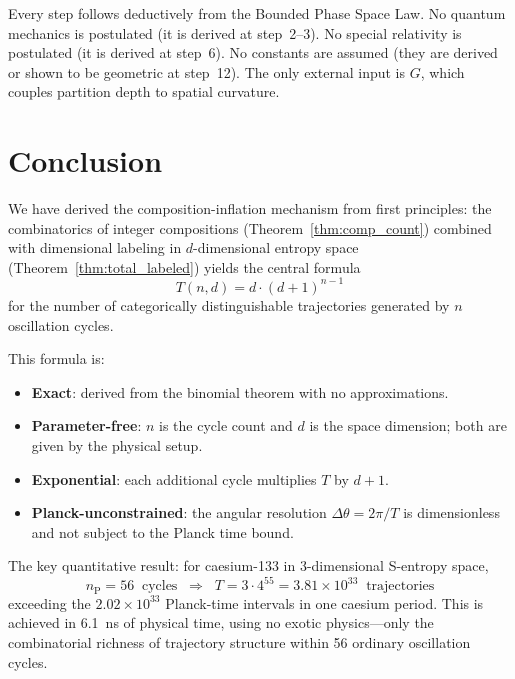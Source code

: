 \documentclass[twocolumn,10pt,a4paper]{article}
\theoremstyle{definition}
\theoremstyle{remark}
\newcommand{\nP}{n_{\mathrm{P}}}
\begin{document}
Every step follows deductively from the Bounded Phase Space Law. No quantum mechanics is postulated (it is derived at step~2--3). No special relativity is postulated (it is derived at step~6). No constants are assumed (they are derived or shown to be geometric at step~12). The only external input is $G$, which couples partition depth to spatial curvature.


\section{Conclusion}
\label{sec:conclusion}

We have derived the composition-inflation mechanism from first principles: the combinatorics of integer compositions (Theorem~\ref{thm:comp_count}) combined with dimensional labeling in $d$-dimensional entropy space (Theorem~\ref{thm:total_labeled}) yields the central formula
\begin{equation}
\boxed{T(n,d) = d \cdot (d+1)^{n-1}}
\end{equation}
for the number of categorically distinguishable trajectories generated by $n$ oscillation cycles.

This formula is:
\begin{itemize}
\item \textbf{Exact}: derived from the binomial theorem with no approximations.
\item \textbf{Parameter-free}: $n$ is the cycle count and $d$ is the space dimension; both are given by the physical setup.
\item \textbf{Exponential}: each additional cycle multiplies $T$ by $d+1$.
\item \textbf{Planck-unconstrained}: the angular resolution $\Delta\theta = 2\pi/T$ is dimensionless and not subject to the Planck time bound.
\end{itemize}

The key quantitative result: for caesium-133 in 3-dimensional S-entropy space,
\begin{equation}
\boxed{\nP = 56 \;\;\text{cycles} \;\;\Longrightarrow\;\; T = 3 \cdot 4^{55} = 3.81 \times 10^{33} \;\;\text{trajectories}}
\end{equation}
exceeding the $2.02 \times 10^{33}$ Planck-time intervals in one caesium period. This is achieved in 6.1~ns of physical time, using no exotic physics---only the combinatorial richness of trajectory structure within 56 ordinary oscillation cycles.
\end{document}

